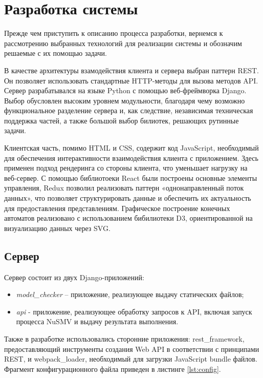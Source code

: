 \chapter{Разработка системы}

Прежде чем приступить к описанию процесса разработки, вернемся к рассмотрению выбранных технологий для реализации системы и обозначим решаемые с их помощью задачи.

В качестве архитектуры взамодействия клиента и сервера выбран паттерн REST. Он позволяет использовать стандартные HTTP-методы для вызова методов API. Сервер разрабатывался на языке Python с помощью веб-фреймворка Django. Выбор обусловлен высоким уровнем модульности, благодаря чему возможно функциональное разделение сервера и, как следствие, независимая техническая поддержка частей, а также большой выбор билиотек, решающих рутинные задачи.

Клиентская часть, помимо HTML и CSS, содержит код JavaScript, необходимый для обеспечения интерактивности взаимодействия клиента с приложением. Здесь применен подход рендеринга со стороны клиента, что уменьшает нагрузку на веб-сервер. С помощью библиотоеки React были построены основные элементы управления, Redux позволил реализовать паттерн «однонаправленный поток данных», что позволяет структурировать данные и обеспечить их актуальность для предоставления представлениям. Графическое построение конечных автоматов реализовано с использованием бибилиотеки D3, ориентированной на визуализацию данных через SVG.

\section{Сервер}

Сервер состоит из двух Django-приложений: 

\begin{itemize}
	\item \textit{model\_checker} -- приложение, реализующее выдачу статических файлов;
	\item \textit{api} - приложение, реализующее обработку запросов к API, включая запуск процесса NuSMV и выдачу результата выполнения.
\end{itemize}

Также в разработке использовались сторонние приложения: rest\_framework, предоставляющий инструменты создания Web API в соответствии с принципами REST, и webpack\_loader, необходимый для загрузки JavaScript bundle файлов. Фрагмент конфигурационного файла приведен в листинге \ref{lst:config}.

